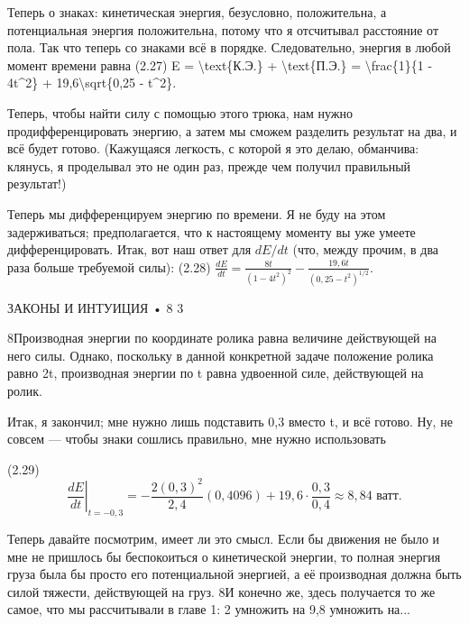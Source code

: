 \documentclass[10pt,oneside]{article}
\begin{document}
Теперь о знаках: кинетическая энергия, безусловно, положительна, а потенциальная энергия положительна, потому что я отсчитывал расстояние от пола. Так что теперь со знаками всё в порядке. Следовательно, энергия в любой момент времени равна (2.27) E = \textbackslash{}text\{К.Э.\} + \textbackslash{}text\{П.Э.\} = \textbackslash{}frac\{1\}\{1 - 4t\textasciicircum{}2\} + 19,6\textbackslash{}sqrt\{0,25 - t\textasciicircum{}2\}.\par

Теперь, чтобы найти силу с помощью этого трюка, нам нужно продифференцировать энергию, а затем мы сможем разделить результат на два, и всё будет готово. (Кажущаяся легкость, с которой я это делаю, обманчива: клянусь, я проделывал это не один раз, прежде чем получил правильный результат!)\par

Теперь мы дифференцируем энергию по времени. Я не буду на этом задерживаться; предполагается, что к настоящему моменту вы уже умеете дифференцировать. Итак, вот наш ответ для \(dE/dt\) (что, между прочим, в два раза больше требуемой силы): (2.28) \(\frac{dE}{dt} = \frac{8t}{(1 - 4t^2)^2} - \frac{19,6t}{(0,25 - t^2)^{1/2}}\).\par

ЗАКОНЫ И ИНТУИЦИЯ • 8 3\par

8Производная энергии по координате ролика равна величине действующей на него силы. Однако, поскольку в данной конкретной задаче положение ролика равно 2t, производная энергии по t равна удвоенной силе, действующей на ролик.\par

Итак, я закончил; мне нужно лишь подставить 0,3 вместо t, и всё готово. Ну, не совсем --- чтобы знаки сошлись правильно, мне нужно использовать\par

(2.29) \[\left. \frac{dE}{dt} \right|_{t = -0,3} = -\frac{2(0,3)^2}{2,4}(0,4096) + 19,6 \cdot \frac{0,3}{0,4} \approx 8,84\text{ ватт}.\]\par

Теперь давайте посмотрим, имеет ли это смысл. Если бы движения не было и мне не пришлось бы беспокоиться о кинетической энергии, то полная энергия груза была бы просто его потенциальной энергией, а её производная должна быть силой тяжести, действующей на груз. 8И конечно же, здесь получается то же самое, что мы рассчитывали в главе 1: 2 умножить на 9,8 умножить на...\par
\end{document}
